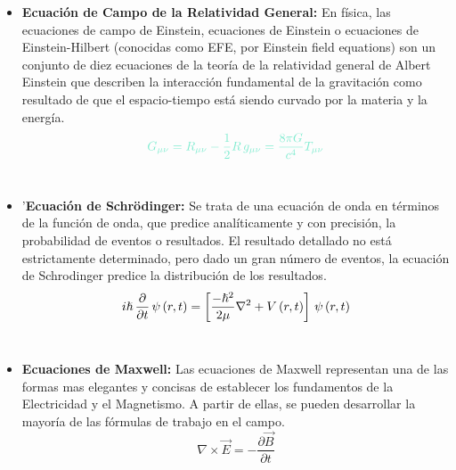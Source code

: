 \documentclass[letterpaper, 12pt]{article}
\begin{document}
    \begin{itemize}\renewcommand{\labelitemi}{$\infty$}
    
        \item \textbf{Ecuación de Campo de la Relatividad General:} En física, las ecuaciones de campo de Einstein, ecuaciones de Einstein o ecuaciones de Einstein-Hilbert (conocidas como EFE, por Einstein field equations) son un conjunto de diez ecuaciones de la teoría de la relatividad general de Albert Einstein que describen la interacción fundamental de la gravitación como resultado de que el espacio-tiempo está siendo curvado por la materia y la energía. \\
        
            \begin{equation*}
                \textcolor{mygreen}{G_{\mu \nu} = R_{\mu \nu} - \frac{1}{2}R\thinspace g_{\mu \nu} = \frac{8\pi G}{c^4}T_{\mu \nu}}
            \end{equation*}\\
            
        \item '\textbf{Ecuación de Schrödinger:} Se trata de una ecuación de onda en términos de la función de onda, que predice analíticamente y con precisión, la probabilidad de eventos o resultados. El resultado detallado no está estrictamente determinado, pero dado un gran número de eventos, la ecuación de Schrodinger predice la distribución de los resultados. \\
        
            \begin{equation*}
                i\hslash \thinspace \frac{\partial}{\partial t} \thinspace \psi \thinspace (r, t) = \left[\frac{-\hslash ^2}{2 \mu} \nabla ^2 + V \thinspace (r, t)\right] \thinspace \psi \thinspace (r, t)
            \end{equation*}\\
            
        \item \textbf{Ecuaciones de Maxwell:} Las ecuaciones de Maxwell representan una de las formas mas elegantes y concisas de establecer los fundamentos de la Electricidad y el Magnetismo. A partir de ellas, se pueden desarrollar la mayoría de las fórmulas de trabajo en el campo. \\
        
            \begin{equation}
                \nabla \times \Vec{E} = - \frac{\partial \Vec{B}}{\partial t}
            \end{equation}\\
            

\end{itemize}
\end{document}
